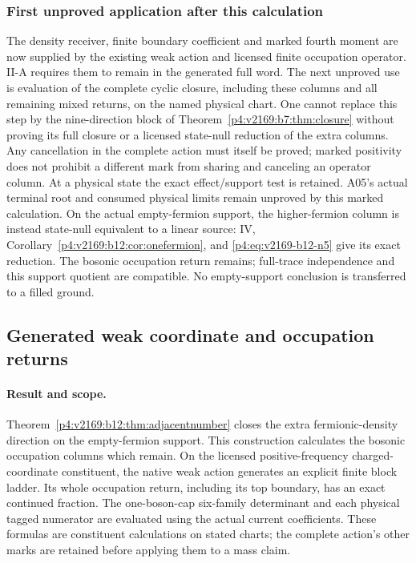 \documentclass[12pt,a4paper]{article}
\begin{document}
\subsubsection{First unproved application after this calculation}
The density receiver, finite boundary coefficient and marked fourth moment
are now supplied by the existing weak action and licensed finite occupation
operator. II-A requires them to remain in the generated full word. The next
unproved use is evaluation of the complete cyclic closure, including these
columns and all remaining mixed returns, on the named physical chart.
One cannot replace this step by the nine-direction block of Theorem~\ref{p4:v2169:b7:thm:closure} without
proving its full closure or a licensed state-null reduction of the extra
columns. Any cancellation in the complete action must itself be proved;
marked positivity does not prohibit a different mark from sharing and
canceling an operator column. At a physical state the exact effect/support
test is retained. A05's actual terminal root and consumed physical limits
remain unproved by this marked calculation.
On the actual empty-fermion support, the higher-fermion column is instead
state-null equivalent to a linear source: IV,
Corollary~\ref{p4:v2169:b12:cor:onefermion}, and
\eqref{p4:eq:v2169-b12-n5} give its exact reduction. The bosonic
occupation return remains; full-trace independence and this support quotient
are compatible. No empty-support conclusion is transferred to a filled ground.



\subsection{Generated weak coordinate and occupation returns}
\label{p5c:sec:v2169-weak-occupation}
\paragraph{Result and scope.}
Theorem~\ref{p4:v2169:b12:thm:adjacentnumber} closes the extra fermionic-density direction on the empty-fermion
support. This construction calculates the bosonic occupation columns which remain.
On the licensed positive-frequency charged-coordinate constituent, the native
weak action generates an explicit finite block ladder. Its whole occupation
return, including its top boundary, has an exact continued fraction.
The one-boson-cap six-family determinant and each physical tagged numerator
are evaluated using the actual current coefficients. These formulas are
constituent calculations on stated charts; the complete action's other
marks are retained before applying them to a mass claim.
\end{document}
